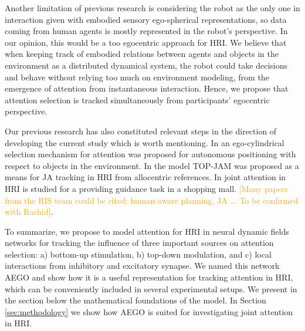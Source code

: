 \documentclass[letterpaper, 10 pt, conference]{ieeeconf}  %
\begin{document}
	
	
	
	
	Another limitation of previous research is considering the robot as the only one in interaction given with embodied sensory ego-spherical representations, so data coming from human agents is mostly represented in the robot's perspective. In our opinion, this would be a too egocentric approach for HRI. We believe that when keeping track of embodied relations between agents and objects in the environment as a distributed dynamical system, the robot could take decisions and behave without relying too much on environment modeling, from the emergence of attention from instantaneous interaction. Hence, we propose that attention selection is tracked simultaneously from participants' egocentric perspective. 
	 
	Our previous research has also constituted relevant steps in the direction of developing the current study which is worth mentioning. In \cite{chame2016} an ego-cylindrical selection mechanism for attention was proposed for autonomous positioning with respect to objects in the environment. In \cite{chame2023top} the model TOP-JAM was proposed as a means for JA tracking in HRI from allocentric references. In \cite{heikkila2019} joint attention in HRI is studied for a providing guidance task in a shopping mall. \textcolor{orange}{[Many papers from the RIS team could be cited: human-aware planning, JA ... To be confirmed with Rachid]}.
	 
	To summarize, we propose to model attention for HRI in neural dynamic fields networks for tracking the influence of three important sources on attention selection: a) bottom-up stimulation, b) top-down modulation, and c) local interactions from inhibitory and excitatory synapse. We named this network AEGO and show how it is a useful representation for tracking attention in HRI, which can be conveniently included in several experimental setups. We present in the section below the mathematical foundations of the model. In Section \ref{sec:methodology} we show how AEGO is suited for investigating joint attention in HRI.
	
\end{document}
